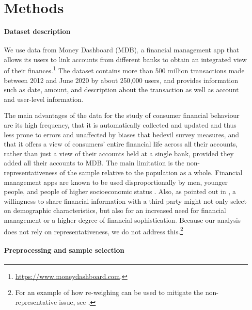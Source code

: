 
\section{Methods}%
\label{sec:methods}


\paragraph{Dataset description}
\label{par:dataset_description}

We use data from Money Dashboard (MDB), a financial management app that allows
its users to link accounts from different banks to obtain an integrated view of
their
finances.\footnote{\href{https://www.moneydashboard.com}{https://www.moneydashboard.com}.}
The dataset contains more than 500 million transactions made between 2012 and
June 2020 by about 250,000 users, and provides information such as date,
amount, and description about the transaction as well as account and user-level
information.

The main advantages of the data for the study of consumer financial behaviour
are its high frequency, that it is automatically collected and updated and thus
less prone to errors and unaffected by biases that bedevil survey measures, and
that it offers a view of consumers' entire financial life across all their
accounts, rather than just a view of their accounts held at a single bank,
provided they added all their accounts to MDB. The main limitation is the
non-representativeness of the sample relative to the population as a whole.
Financial management apps are known to be used disproportionally by men,
younger people, and people of higher socioeconomic status
\citep{carlin2019generational}. Also, as pointed out in
\citet{gelman2014harnessing}, a willingness to share financial information with
a third party might not only select on demographic characteristics, but also
for an increased need for financial management or a higher degree of financial
sophistication. Because our analysis does not rely on representativeness, we do
not address this.\footnote{For an example of how re-weighing can be used to
mitigate the non-representative issue, see \citet{bourquin2020effects}.}


\paragraph{Preprocessing and sample selection}%
\label{par:preprocessing_and_sample_selection}

